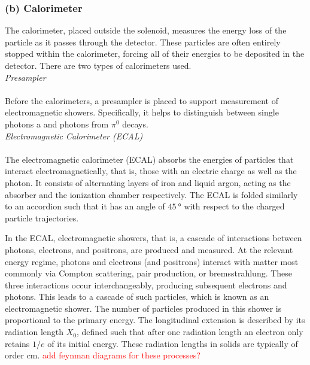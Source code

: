 \documentclass[a4paper]{report}
\numberwithin{equation}{section}
\begin{document}
\subsubsection{(b) Calorimeter}

The calorimeter, placed outside the solenoid, measures the energy loss of the particle as it passes through the detector. These particles are often entirely stopped 
within the calorimeter, forcing all of their energies to be deposited in the detector. There are two types of calorimeters used. \\

\noindent \textit{Presampler} \\ \\
Before the calorimeters, a presampler is placed to support measurement of electromagnetic showers. Specifically, it helps to distinguish between single photons a
and photons from $\pi^0$ decays. \\ 

\noindent \textit{Electromagnetic Calorimeter (ECAL)}\\ \\
The electromagnetic calorimeter (ECAL) absorbs the energies of particles that interact electromagnetically, that is, those with an electric charge as well as the photon. 
It consists of alternating layers of iron and liquid argon, acting as the absorber and the ionization chamber respectively. The ECAL is folded similarly to 
an accordion such that it has an angle of $\SI{45}{\degree}$ with respect to the charged particle trajectories.  \par 

In the ECAL, electromagnetic showers, that is, a cascade of interactions between photons, electrons, and positrons, are produced and measured. At the relevant energy 
regime, photons and electrons (and positrons) interact with matter most commonly via Compton scattering, pair production, or bremsstrahlung. 
These three interactions occur interchangeably, producing subsequent electrons and photons. This leads to a cascade of such particles, which is known as an 
electromagnetic shower. The number of particles produced in this shower is proportional to the primary energy. 
The longitudinal extension is described by its radiation length $X_0$, defined such that after one radiation length an electron only retains 
$1 / e$ of its initial energy. These radiation lengths in solids are typically of order cm. \textcolor{red}{add feynman diagrams for 
these processes?}\par 
\end{document}
